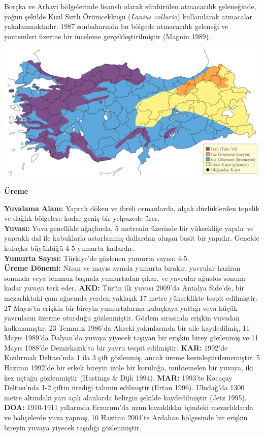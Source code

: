 \documentclass[
  letterpaper,
  DIV=11,
  numbers=noendperiod]{scrreprt}
\begin{document}
Borçka ve Arhavi bölgelerinde lisanslı olarak sürdürülen atmacacılık
geleneğinde, yoğun şekilde Kızıl Sırtlı Örümcekkuşu (\emph{Lanius
collurio}) kullanılarak atmacalar yakalanmaktadır. 1987 sonbaharında bu
bölgede atmacacılık geleneği ve yöntemleri üzerine bir inceleme
gerçekleştirilmiştir (Magnin 1989).

\includegraphics{images/harita_Page_100.png}

\textbf{Üreme}

\textbf{Yuvalama Alanı:} Yaprak döken ve ibreli ormanlarda, alçak
düzlüklerden tepelik ve dağlık bölgelere kadar geniş bir yelpazede
ürer.\\
\textbf{Yuvası:} Yuva genellikle ağaçlarda, 5 metrenin üzerinde bir
yüksekliğe yapılır ve yapraklı dal ile kabuklarla astarlanmış dallardan
oluşan basit bir yapıdır. Genelde kuluçka büyüklüğü 4-5 yumurta
kadardır.\\
\textbf{Yumurta Sayısı:} Türkiye'de gözlenen yumurta sayısı: 4-5.\\
\textbf{Üreme Dönemi:} Nisan ve mayıs ayında yumurta bırakır, yavrular
haziran sonunda veya temmuz başında yumurtadan çıkar, ve yavrular
ağustos sonuna kadar yuvayı terk eder. \textbf{AKD:} Türün ilk yuvası
2009'da Antalya Side'de, bir mezarlıktaki çam ağacında yerden yaklaşık
17 metre yükseklikte tespit edilmiştir. 27 Mayıs'ta erişkin bir bireyin
yumurtalarına kuluçkaya yattığı veya küçük yavruların üzerine oturduğu
gözlenmiştir. Gözlem sırasında erişkin yuvadan kalkmamıştır. 23 Temmuz
1986'da Akseki yakınlarında bir aile kaydedilmiş, 11 Mayıs 1989'da
Dalyan'da yuvaya yiyecek taşıyan bir erişkin birey gözlenmiş ve 11 Mayıs
1988'de Demirkazık'ta bir yavru tespit edilmiştir. \textbf{KAR:} 1992'de
Kızılırmak Deltası'nda 1 ila 3 çift gözlenmiş, ancak üreme
kesinleştirilememiştir. 5 Haziran 1992'de bir erkek bireyin izole bir
koruluğa, muhtemelen bir yuvaya, iki kez uçtuğu gözlenmiştir (Hustings
\& Dijk 1994). \textbf{MAR:} 1993'te Kocaçay Deltası'nda 1-2 çiftin
ürediği tahmin edilmiştir (Ertan 1996). Uludağ'da 1300 metre altındaki
yarı açık alanlarda belirgin şekilde kaydedilmiştir (Jetz 1995).
\textbf{DOA:} 1910-1911 yıllarında Erzurum'da uzun kavaklıklar içindeki
mezarlıklarda ve bahçelerde yuva yapmış, 10 Haziran 2004'te Ardahan
bölgesinde bir erişkin bireyin yuvaya yiyecek taşıdığı gözlenmiştir.
\end{document}
